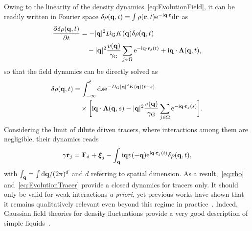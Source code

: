 \documentclass[pre, superscriptaddress, twocolumn,pre]{revtex4-1}
\newcommand{\dd}{\text{d}}
\newcommand{\ee}{\text{e}}
\newcommand{\ii}{\text{i}}
\begin{document}
Owing to the linearity of the density dynamics~\eqref{eq:EvolutionField}, it can be readily written in Fourier space $\delta\rho({\bf q},t)=\int\rho({\bf r},t){\rm e}^{-{\rm i}{\bf q}\cdot{\bf r}} {\rm d}{\bf r}$ as
\begin{equation}\label{eq:FourierEvolutionField}
	\begin{aligned}
		\frac{\partial \delta \rho({\bf q},t)}{\partial t} &= - |{\bf q}|^2 D_{\rm G} K({\bf q}) \delta \rho({\bf q},t)
		\\
		&\quad - |{\bf q}|^2 \frac{v({\bf q})}{\gamma_{\rm G}} \sum_{j\in\Omega}\ee^{-\ii {\bf q} \cdot {\bf r}_j(t)} + \ii{\bf q}\cdot{\boldsymbol\Lambda} ({\bf q},t) ,
	\end{aligned}
\end{equation}
so that the field dynamics can be directly solved as
\begin{equation}\label{eq:rho}
	\begin{aligned}
		\delta\rho({\bf q},t) &= \int_{-\infty}^t \dd s \ee^{-D_{\rm G} |{\bf q}|^2 K({\bf q})(t-s)}
		\\
		&\quad\times \bigg[ \ii{\bf q} \cdot {\boldsymbol\Lambda}({\bf q},s) - |{\bf q}|^2 \frac{v({\bf q})}{\gamma_{\rm G}} \sum_{j\in\Omega}\ee^{-\ii {\bf q}\cdot {\bf r}_j(s)}\bigg] .
	\end{aligned}
\end{equation}
Considering the limit of dilute driven tracers, where interactions among them are negligible, their dynamics reads
\begin{equation}\label{eq:EvolutionTracer}
	\gamma\dot{\bf r}_j = {\bf F}_\text{d} + {\boldsymbol\xi_j} - \int_{\bf q} \ii{\bf q} v(-{\bf q})\ee^{\ii{\bf q} \cdot {\bf r}_j(t)} \delta \rho({\bf q}, t) ,
\end{equation}
with $\int_{\bf q}=\int\dd{\bf q}/(2\pi)^d$ and $d$ referring to spatial dimension. As a result,~\eqref{eq:rho} and~\eqref{eq:EvolutionTracer} provide a  closed dynamics for tracers only. It should only be valid for weak interactions {\it a priori}, yet previous works have shown that it remains qualitatively relevant even beyond this regime in practice~\cite{Demery2015, Martin2018}. Indeed, Gaussian field theories for density fluctuations provide a very good description of simple liquids~\cite{Chandler1993}.
\end{document}
